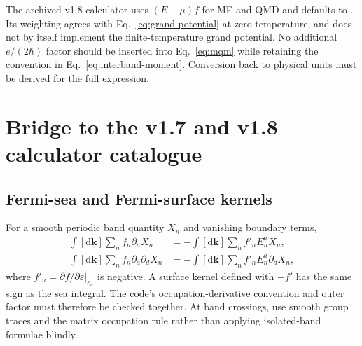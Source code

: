 \documentclass[prx,amsmath,amssymb,superscriptaddress,longbibliography]{revtex4-2}
\newcommand{\dd}{\mathrm{d}}
\newcommand{\code}[1]{\texttt{\detokenize{#1}}}
\begin{document}
The archived v1.8 calculator uses $(E-\mu)f$ for ME and QMD and defaults to
\code{constant_factor=1}. Its weighting agrees with
Eq.~\eqref{eq:grand-potential} at zero temperature, and does not by itself
implement the finite-temperature grand potential.
No additional $e/(2\hbar)$ factor should be inserted into
Eq.~\eqref{eq:mqm} while retaining the convention in Eq.~\eqref{eq:interband-moment}.
Conversion back to physical units must be derived for the full expression.

\section{Bridge to the v1.7 and v1.8 calculator catalogue}
\label{sec:catalogue}

\subsection{Fermi-sea and Fermi-surface kernels}
For a smooth periodic band quantity $X_n$ and vanishing boundary terms,
\begin{align}
 \int[\dd\bm k]\sum_n f_n\partial_aX_n
 &=-\int[\dd\bm k]\sum_n f'_n E_n^a X_n,\label{eq:sea-surface}\\
 \int[\dd\bm k]\sum_n f_n\partial_a\partial_dX_n
 &=-\int[\dd\bm k]\sum_n f'_n E_n^a\partial_dX_n,
 \label{eq:sea-surface2}
\end{align}
where $f'_n=\partial f/\partial\varepsilon|_{\varepsilon_n}$ is negative.
A surface kernel defined with $-f'$ has the same sign as the sea integral.
The code's occupation-derivative convention and outer factor must therefore
be checked together. At band crossings, use smooth group traces and the
matrix occupation rule rather than applying isolated-band formulae blindly.
\end{document}
